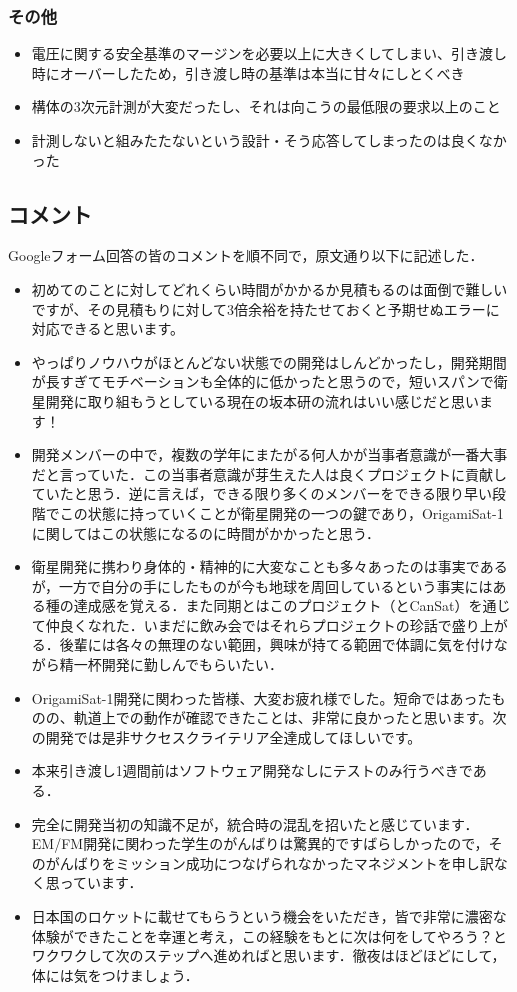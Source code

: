 \subsubsection*{その他}
\begin{itemize}
	\item 電圧に関する安全基準のマージンを必要以上に大きくしてしまい、引き渡し時にオーバーしたため，引き渡し時の基準は本当に甘々にしとくべき
	\item 構体の3次元計測が大変だったし、それは向こうの最低限の要求以上のこと
	\item 計測しないと組みたたないという設計・そう応答してしまったのは良くなかった
\end{itemize}






\subsection{コメント}
Googleフォーム回答の皆のコメントを順不同で，原文通り以下に記述した．
\begin{itemize}
	\item 初めてのことに対してどれくらい時間がかかるか見積もるのは面倒で難しいですが、その見積もりに対して3倍余裕を持たせておくと予期せぬエラーに対応できると思います。
	\item やっぱりノウハウがほとんどない状態での開発はしんどかったし，開発期間が長すぎてモチベーションも全体的に低かったと思うので，短いスパンで衛星開発に取り組もうとしている現在の坂本研の流れはいい感じだと思います！
	\item 開発メンバーの中で，複数の学年にまたがる何人かが当事者意識が一番大事だと言っていた．この当事者意識が芽生えた人は良くプロジェクトに貢献していたと思う．逆に言えば，できる限り多くのメンバーをできる限り早い段階でこの状態に持っていくことが衛星開発の一つの鍵であり，OrigamiSat-1に関してはこの状態になるのに時間がかかったと思う．
	\item 衛星開発に携わり身体的・精神的に大変なことも多々あったのは事実であるが，一方で自分の手にしたものが今も地球を周回しているという事実にはある種の達成感を覚える．また同期とはこのプロジェクト（とCanSat）を通じて仲良くなれた．いまだに飲み会ではそれらプロジェクトの珍話で盛り上がる．後輩には各々の無理のない範囲，興味が持てる範囲で体調に気を付けながら精一杯開発に勤しんでもらいたい．
	\item OrigamiSat-1開発に関わった皆様、大変お疲れ様でした。短命ではあったものの、軌道上での動作が確認できたことは、非常に良かったと思います。次の開発では是非サクセスクライテリア全達成してほしいです。
	\item 本来引き渡し1週間前はソフトウェア開発なしにテストのみ行うべきである．
	\item 完全に開発当初の知識不足が，統合時の混乱を招いたと感じています．EM/FM開発に関わった学生のがんばりは驚異的ですばらしかったので，そのがんばりをミッション成功につなげられなかったマネジメントを申し訳なく思っています．
	\item 日本国のロケットに載せてもらうという機会をいただき，皆で非常に濃密な体験ができたことを幸運と考え，この経験をもとに次は何をしてやろう？とワクワクして次のステップへ進めればと思います．徹夜はほどほどにして，体には気をつけましょう．
\end{itemize}